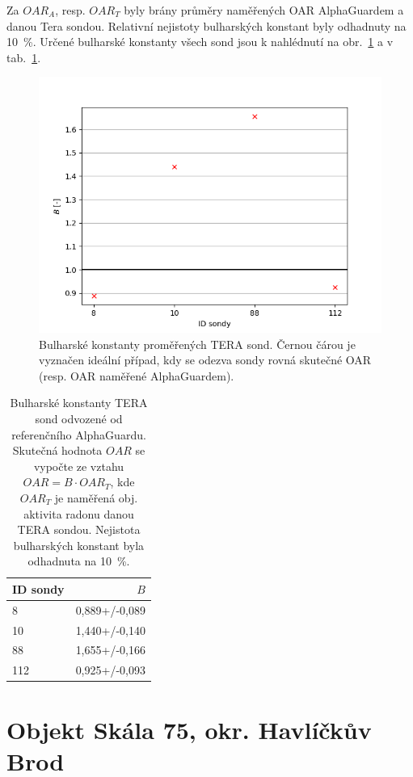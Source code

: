 Za $OAR_A$, resp. $OAR_T$ byly brány průměry naměřených OAR AlphaGuardem a danou Tera sondou. Relativní nejistoty bulharských konstant byly odhadnuty na 10~\%. Určené bulharské konstanty všech sond jsou k nahlédnutí na obr.~\ref{fig:dynMer_sondyB} a v tab.~\ref{tab:dynMer_sondyB}. %
\begin{figure}[H]
	\centering
	\includegraphics[width=0.7\linewidth]{images/sondy_B}
	\caption{Bulharské konstanty proměřených TERA sond. Černou čárou je vyznačen ideální případ, kdy se odezva sondy rovná skutečné OAR (resp. OAR naměřené AlphaGuardem).}
	\label{fig:dynMer_sondyB}
\end{figure}
\begin{table}[ht]
	\centering
	\caption{Bulharské konstanty TERA sond odvozené od referenčního AlphaGuardu. Skutečná hodnota $OAR$ se vypočte ze vztahu $OAR=B\cdot OAR_T$, kde $OAR_T$ je naměřená obj. aktivita radonu danou TERA sondou. Nejistota bulharských konstant byla odhadnuta na 10~\%.}
	\label{tab:dynMer_sondyB}
	\begin{tabular}{lr}
		\toprule
		ID sondy &     $B$ \\
		\midrule
		8   & 0,889+/-0,089\\
		10  & 1,440+/-0,140\\
		88  & 1,655+/-0,166\\
		112 & 0,925+/-0,093\\
		\bottomrule
	\end{tabular}
\end{table}
\section{Objekt Skála 75, okr. Havlíčkův Brod}
